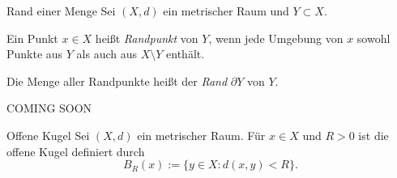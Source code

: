 \begin{definition}{Rand einer Menge}
    Sei $(X,d)$ ein metrischer Raum und $Y\subset X$. 
    
    Ein Punkt $x\in X$ heißt \emph{Randpunkt} von $Y$, wenn jede Umgebung von $x$ sowohl Punkte aus $Y$ als auch aus $X\setminus Y$ enthält. 
    
    Die Menge aller Randpunkte heißt der \emph{Rand} $\partial Y$ von $Y$.
\end{definition}

\begin{beispielbox}
    COMING SOON
\end{beispielbox}

\begin{definition}{Offene Kugel}
    Sei $(X,d)$ ein metrischer Raum. Für $x\in X$ und $R > 0$ ist die offene Kugel definiert durch
    $$
        B_R(x) := \{y\in X : d(x,y) < R\}.
    $$
\end{definition}





